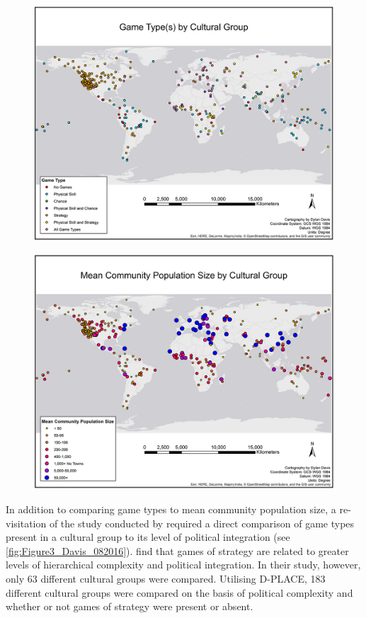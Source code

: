 \documentclass[%
	]{ijsra}
\begin{document}
\begin{figure} [!htb] %
	\includegraphics[width=\linewidth]{figures/Figure1_Davis_082016}
	\caption
	\centering
	\label{fig:Figure1_Davis_082016}
\end{figure}

\begin{figure} [!htb] %
	\includegraphics[width=\linewidth]{figures/Figure2_Davis_082016}
	\caption
	\centering
	\label{fig:Figure2_Davis_082016}
\end{figure}

In addition to comparing game types to mean community population size, a re-visitation of the study conducted by  \textcite{roberts1959} required a direct comparison of game types present in a cultural group to its level of political integration (see \cref{fig:Figure3_Davis_082016}).  \textcite{roberts1959} find that games of strategy are related to greater levels of hierarchical complexity and political integration. In their study, however, only 63 different cultural groups were compared. Utilising D-PLACE, 183 different cultural groups were compared on the basis of political complexity and whether or not games of strategy were present or absent.
\end{document}

